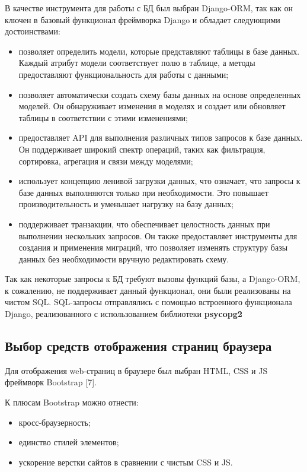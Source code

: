 В качестве инструмента для работы с БД был выбран Django-ORM, так как он ключен в базовый функционал фреймворка Django и обладает следующими достоинствами:

\begin{itemize}
	\item позволяет определить модели, которые представляют таблицы в базе данных. Каждый атрибут модели соответствует полю в таблице, а методы предоставляют функциональность для работы с данными;
	\item позволяет автоматически создать схему базы данных на основе определенных моделей. Он обнаруживает изменения в моделях и создает или обновляет таблицы в соответствии с этими изменениями;
	\item предоставляет API для выполнения различных типов запросов к базе данных. Он поддерживает широкий спектр операций, таких как фильтрация, сортировка, агрегация и связи между моделями;
	\item использует концепцию ленивой загрузки данных, что означает, что запросы к базе данных выполняются только при необходимости. Это повышает производительность и уменьшает нагрузку на базу данных;
	\item поддерживает транзакции, что обеспечивает целостность данных при выполнении нескольких запросов. Он также предоставляет инструменты для создания и применения миграций, что позволяет изменять структуру базы данных без необходимости вручную редактировать схему.
\end{itemize}

Так как некоторые запросы к БД требуют вызовы функций базы, а Django-ORM, к сожалению, не поддерживает данный функционал, они были реализованы на чистом SQL. SQL-запросы отправлялись с помощью встроенного функционала Django, реализованного с использованием библиотеки \textbf{psycopg2}

\subsection{Выбор средств отображения страниц браузера}

Для отображения web-страниц в браузере был выбран HTML, CSS и JS фреймворк Bootstrap [7].

К плюсам Bootstrap можно отнести:
\begin{itemize}
	\item кросс-браузерность;
	\item единство стилей элементов;
	\item ускорение верстки сайтов в сравнении с чистым CSS и JS.
\end{itemize}

